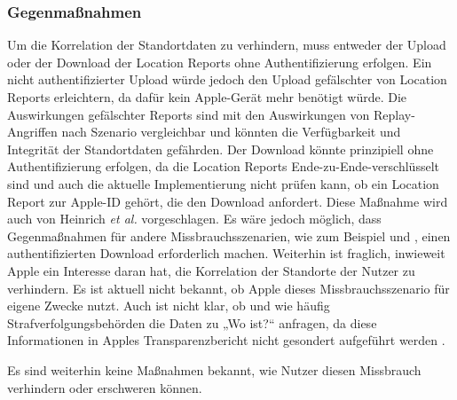 \subsubsection{Gegenmaßnahmen}
Um die Korrelation der Standortdaten zu verhindern, muss entweder der Upload oder der Download der Location Reports ohne Authentifizierung erfolgen.
Ein nicht authentifizierter Upload würde jedoch den Upload gefälschter von Location Reports erleichtern, da dafür kein Apple-Gerät mehr benötigt würde.
Die Auswirkungen gefälschter Reports sind mit den Auswirkungen von Replay-Angriffen nach Szenario  vergleichbar und könnten die Verfügbarkeit und Integrität der Standortdaten gefährden.
Der Download könnte prinzipiell ohne Authentifizierung erfolgen, da die Location Reports Ende-zu-Ende-verschlüsselt sind und auch die aktuelle Implementierung nicht prüfen kann, ob ein Location Report zur Apple-ID gehört, die den Download anfordert.
Diese Maßnahme wird auch von Heinrich \textit{et al.} \cite{Heinrich_FindMy} vorgeschlagen.
Es wäre jedoch möglich, dass Gegenmaßnahmen für andere Missbrauchsszenarien, wie zum Beispiel  und , einen authentifizierten Download erforderlich machen.
Weiterhin ist fraglich, inwieweit Apple ein Interesse daran hat, die Korrelation der Standorte der Nutzer zu verhindern.
Es ist aktuell nicht bekannt, ob Apple dieses Missbrauchsszenario für eigene Zwecke nutzt.
Auch ist nicht klar, ob und wie häufig Strafverfolgungsbehörden die Daten zu „Wo ist?“ anfragen, da diese Informationen in Apples Transparenzbericht nicht gesondert aufgeführt werden \cite{Apple_Transparency}.

Es sind weiterhin keine Maßnahmen bekannt, wie Nutzer diesen Missbrauch verhindern oder erschweren können.
